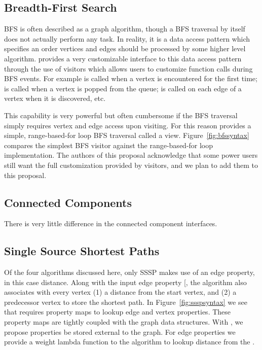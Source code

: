 \subsection{Breadth-First Search}
BFS is often described as a graph algorithm, though a BFS traversal
by itself does not actually perform any task.
In reality, it is a data access pattern which specifies an order
vertices and edges should be processed by some higher level algorithm.
\bgl provides a very customizable interface to this
data access pattern through the use of visitors which allows users
to customize function calls during BFS events.
For example  is called when a vertex is encountered for the
first time;  is called when a vertex is popped from the queue;
 is called on each edge of a vertex when it is discovered, etc.


This capability is very powerful but often cumbersome if the BFS traversal
simply requires vertex and edge access upon visiting.
For this reason \stdgraph provides a simple, range-based-for loop BFS traversal
called a view.
Figure~\ref{fig:bfssyntax} compares the simplest \bgl
BFS visitor against the range-based-for loop implementation.
The authors of this proposal acknowledge that some power users still want
the full customization provided by visitors,
and we plan to add them to this proposal.

\subsection{Connected Components}
There is very little difference in the connected component interfaces.


\subsection{Single Source Shortest Paths}
Of the four algorithms discussed here, only SSSP makes use of an
edge property, in this case distance.
Along with the input edge property [, the algorithm also associates with
every vertex (1) a distance from the start vertex, and (2) a predecessor
vertex to store the shortest path.
In Figure~\ref{fig:ssspsyntax} we see that \bgl requires
property maps to lookup edge and vertex properties.
These property maps are tightly coupled with the graph data structures.
With \stdgraph, we propose properties be stored external to the graph.
For edge properties we provide a weight lambda function to the algorithm
to lookup distance from the .

